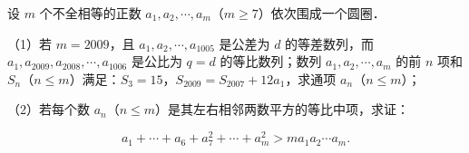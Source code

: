 \endgroup
\begin{question}
设 $m$ 个不全相等的正数 $a_1,a_2,\cdots,a_m$（$m\geqslant7$）依次围成一个圆圈．

（1）若 $m=2009$，且 $a_1,a_2,\cdots,a_{1005}$ 是公差为 $d$ 的等差数列，而 $a_1,a_{2009},a_{2008},\cdots,a_{1006}$ 是公比为 $q=d$ 的等比数列；数列 $a_1,a_2,\cdots,a_m$ 的前 $n$ 项和 $S_n$（$n\leqslant m$）满足：$S_3=15$，$S_{2009}=S_{2007}+12a_1$，求通项 $a_n$（$n\leqslant m$）；

（2）若每个数 $a_n$（$n\leqslant m$）是其左右相邻两数平方的等比中项，求证：

\nopagebreak[4]
\[a_1+\cdots+a_6+a_7^2+\cdots+a_m^2>ma_1a_2\cdots a_m.\]

\end{question}